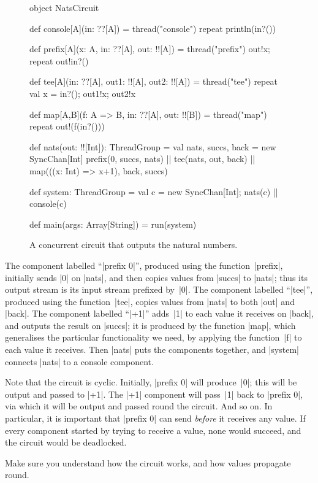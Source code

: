 \begin{figure}
\begin{scala}
object NatsCircuit{
  def console[A](in: ??[A]) = thread("console"){ repeat{ println(in?()) } }

  def prefix[A](x: A, in: ??[A], out: !![A]) = thread("prefix"){
    out!x; repeat{ out!in?() }
  }

  def tee[A](in: ??[A], out1: !![A], out2: !![A]) = thread("tee"){
    repeat{ val x = in?(); out1!x; out2!x }
  }

  def map[A,B](f: A => B, in: ??[A], out: !![B]) = thread("map"){
    repeat{ out!(f(in?())) }
  }

  def nats(out: !![Int]): ThreadGroup = {
    val nats, succs, back = new SyncChan[Int]
    prefix(0, succs, nats) || tee(nats, out, back) ||
      map(((x: Int) => x+1), back, succs)
  }

  def system: ThreadGroup = {
    val c = new SyncChan[Int]; nats(c) || console(c)
  }

  def main(args: Array[String]) = run(system)
}
\end{scala}
\caption{A concurrent circuit that outputs the natural numbers.}
\label{fig:NatsCircuit}
\end{figure}

The component labelled ``|prefix 0|'', produced using the function~|prefix|,
initially sends |0| on |nats|, and then copies values from |succs| to |nats|;
thus its output stream is its input stream prefixed by~|0|.  The component
labelled ``|tee|'', produced using the function~|tee|, copies values from
|nats| to both |out| and |back|.  The component labelled ``|+1|'' adds~|1| to
each value it receives on |back|, and outputs the result on |succs|; it is
produced by the function |map|, which generalises the particular functionality
we need, by applying the function~|f| to each value it receives.  Then |nats|
puts the components together, and |system| connects |nats| to a console
component.

Note that the circuit is cyclic.  Initially, |prefix 0| will produce~|0|; this
will be output and passed to |+1|.  The |+1| component will pass~|1| back to
|prefix 0|, via which it will be output and passed round the circuit.  And so
on.  In particular, it is important that |prefix 0| can send \emph{before} it
receives any value.  If every component started by trying to receive a value,
none would succeed, and the circuit would be deadlocked. 

\begin{instruction}
Make sure you understand how the circuit works, and how values propagate
round.
\end{instruction}

